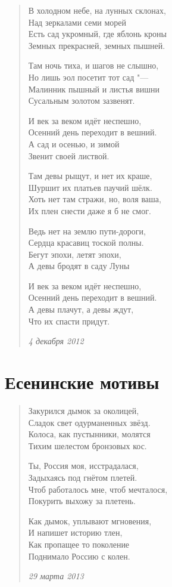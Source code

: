 \documentclass[a4paper,12pt]{article}
\newcommand{\ldotst}{\so{...}\xspace}
\begin{document}
\begin{verse}
В холодном небе, на лунных склонах,\\
Над зеркалами семи морей\\
Есть сад укромный, где яблонь кроны\\
Земных прекрасней, земных пышней.

Там ночь тиха, и шагов не слышно,\\
Но лишь эол посетит тот сад "---\\
Малинник пышный и листья вишни\\
Сусальным золотом зазвенят.

И век за веком идёт неспешно,\\
Осенний день переходит в вешний.\\
А сад и осенью, и зимой\\
Звенит своей листвой.

Там девы рыщут, и нет их краше,\\
Шуршит их платьев паучий шёлк.\\
Хоть нет там стражи, но, воля ваша,\\
Их плен снести даже я б не смог.

Ведь нет на землю пути-дороги,\\
Сердца красавиц тоской полны.\\
Бегут эпохи, летят эпохи,\\
А девы бродят в саду Луны\ldotst

И век за веком идёт неспешно,\\
Осенний день переходит в вешний.\\
А девы плачут, а девы ждут,\\
Что их спасти придут.

\emph{4 декабря 2012}
\end{verse}
\newpage

\section{Есенинские мотивы}

\begin{verse}
Закурился дымок за околицей,\\
Сладок свет одурманенных звёзд.\\
Колоса, как пустынники, молятся\\
Тихим шелестом бронзовых кос.

Ты, Россия моя, исстрадалася,\\
Задыхаясь под гнётом плетей.\\
Чтоб работалось мне, чтоб мечталося,\\
Покурить выхожу за плетень.

Как дымок, уплывают мгновения,\\
И напишет историю тлен,\\
Как пропащее то поколение\\
Поднимало Россию с колен.

\emph{29 марта 2013}
\end{verse}
\newpage
\end{document}
